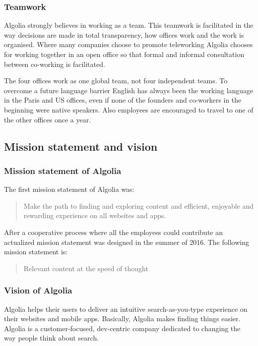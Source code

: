 \subsubsection{Teamwork}

Algolia strongly believes in working as a team. This teamwork is facilitated in the way decisions are made in total transparency, how offices work and the work is organised. Where many companies choose to promote teleworking Algolia chooses for working together in an open office so that formal and informal consultation between co-working is facilitated.

The four offices work as one global team, not four independent teams. To overcome a future language barrier English has always been the working language in the Paris and US offices, even if none of the founders and co-workers in the beginning were native speakers. Also employees are encouraged to travel to one of the other offices once a year. 

\subsection{Mission statement and vision}
\subsubsection{Mission statement of Algolia}

The first mission statement of Algolia was:


\begin{quote}
Make the path to finding and exploring content and efficient, enjoyable and rewarding experience on all websites and apps.
\end{quote}

After a cooperative process where all the employees could contribute an actualized mission statement was designed in the summer of 2016. The following mission statement is:

\begin{quote}
Relevant content at the speed of thought
\end{quote}

\subsubsection{Vision of Algolia}

Algolia helps their users to deliver an intuitive search-as-you-type experience on their websites and mobile apps. Basically, Algolia makes finding things easier. Algolia is a customer-focused, dev-centric company dedicated to changing the way people think about search.

